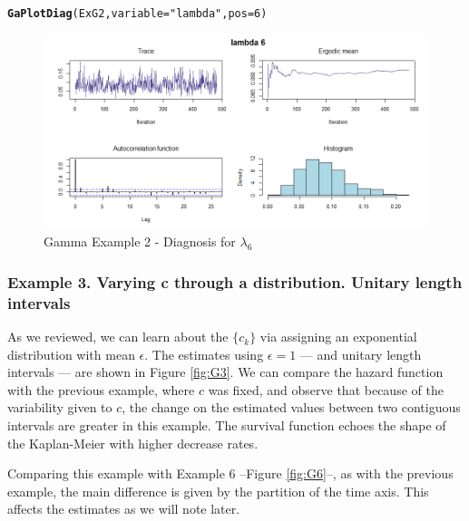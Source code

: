\documentclass[letterpaper]{article}\usepackage[]{graphicx}\usepackage[]{xcolor}
\makeatletter
\newcommand{\hlnum}[1]{\textcolor[rgb]{0.686,0.059,0.569}{#1}}%
\newcommand{\hlstr}[1]{\textcolor[rgb]{0.192,0.494,0.8}{#1}}%
\newcommand{\hlstd}[1]{\textcolor[rgb]{0.345,0.345,0.345}{#1}}%
\newcommand{\hlkwc}[1]{\textcolor[rgb]{0.333,0.667,0.333}{#1}}%
\newcommand{\hlkwd}[1]{\textcolor[rgb]{0.737,0.353,0.396}{\textbf{#1}}}%
\newenvironment{kframe}{%
 \def\at@end@of@kframe{}%
 \ifinner\ifhmode%
  \def\at@end@of@kframe{\end{minipage}}%
  \begin{minipage}{\columnwidth}%
 \fi\fi%
 \def\FrameCommand##1{\hskip\@totalleftmargin \hskip-\fboxsep
 \colorbox{shadecolor}{##1}\hskip-\fboxsep
     \hskip-\linewidth \hskip-\@totalleftmargin \hskip\columnwidth}%
 \MakeFramed {\advance\hsize-\width
   \@totalleftmargin\z@ \linewidth\hsize
   \@setminipage}}%
 {\par\unskip\endMakeFramed%
 \at@end@of@kframe}
\newenvironment{knitrout}{}{} %
\makeatother
\begin{document}
\begin{knitrout}
\color{fgcolor}\begin{kframe}
\begin{alltt}
\hlkwd{GaPlotDiag}\hlstd{(ExG2,} \hlkwc{variable} \hlstd{=} \hlstr{"lambda"}\hlstd{,} \hlkwc{pos} \hlstd{=} \hlnum{6}\hlstd{)}
\end{alltt}
\end{kframe}
\end{knitrout}

\begin{figure}
  \centering
  \includegraphics[width=\textwidth]{G23.png}
  \caption{Gamma Example 2 - Diagnosis for $\lambda_6$}
  \label{fig:G2a}
\end{figure}

\subsubsection{Example 3. Varying c through a distribution. Unitary length intervals}

As we reviewed, we can learn about the $\{c_k\}$ via assigning an exponential distribution with mean $\epsilon$. The estimates using $\epsilon = 1$ ---- and unitary length intervals ---- are shown in Figure \ref{fig:G3}. We can compare the hazard function with the previous example, where $c$ was fixed, and observe that because of the variability given to $c$, the change on the estimated values between two contiguous intervals are greater in this example. The survival function echoes the shape of the Kaplan-Meier with higher decrease rates. 

Comparing this example with Example 6 --Figure \ref{fig:G6}--, as with the previous example, the main difference is given by the partition of the time axis. This affects the estimates as we will note later.
\end{document}
